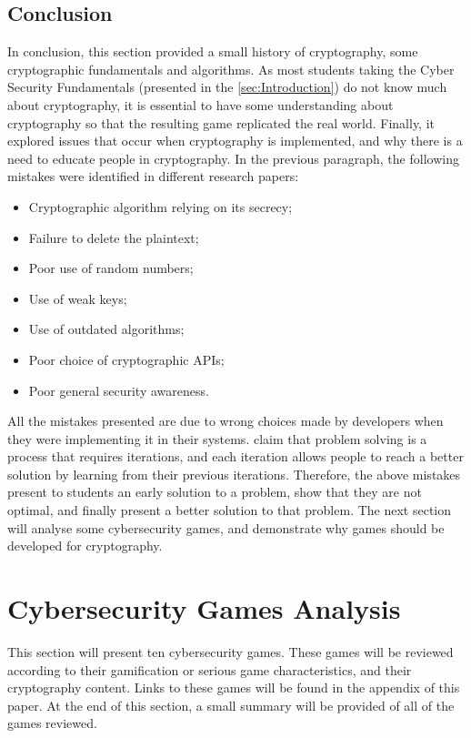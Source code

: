 \documentclass{l4proj}
\begin{document}
\subsection{Conclusion}

In conclusion, this section provided a small history of cryptography, some cryptographic fundamentals and algorithms. 
As most students taking the Cyber Security Fundamentals (presented in the \ref{sec:Introduction}) do not know much about cryptography, 
it is essential to have some understanding about cryptography so that the resulting game replicated the real world.
Finally, it explored issues that occur when cryptography is implemented, and why there is a need to educate people in cryptography.
In the previous paragraph, the following mistakes were identified in different research papers:
\begin{itemize}
    \item Cryptographic algorithm relying on its secrecy;
    \item Failure to delete the plaintext;
    \item Poor use of random numbers;
    \item Use of weak keys;
    \item Use of outdated algorithms;
    \item Poor choice of cryptographic APIs;
    \item Poor general security awareness.
\end{itemize}
All the mistakes presented are due to wrong choices made by developers when they were implementing it in their systems.
\citet{eggleton_value_2001} claim that problem solving is a process that requires iterations, and each iteration allows
people to reach a better solution by learning from their previous iterations. 
Therefore, the above mistakes present to students an early solution to a problem, show that they are not optimal, and
finally present a better solution to that problem. 
The next section will analyse some cybersecurity games, and demonstrate why games should be developed for cryptography.

\section{Cybersecurity Games Analysis}

This section will present ten cybersecurity games. These games will be reviewed according to their gamification or serious game characteristics,
and their cryptography content. Links to these games will be found in the appendix of this paper. 
At the end of this section, a small summary will be provided of all of the games reviewed.
\end{document}

